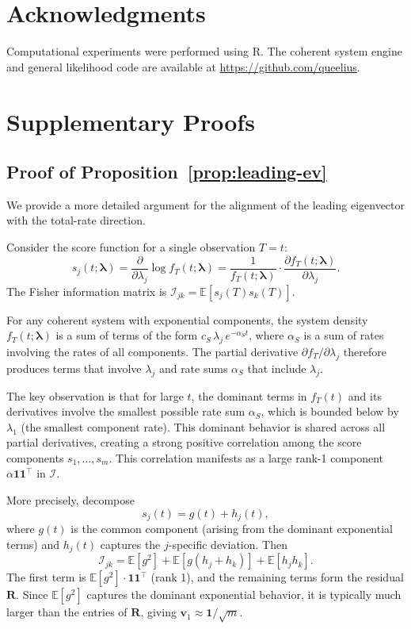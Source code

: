 \documentclass[12pt]{article}
\theoremstyle{definition}
\theoremstyle{remark}
\newcommand{\E}{\mathbb{E}}
\newcommand{\bone}{\mathbf{1}}
\newcommand{\blam}{\boldsymbol{\lambda}}
\begin{document}
\section*{Acknowledgments}

Computational experiments were performed using R.  The coherent system
engine and general likelihood code are available at
\url{https://github.com/queelius}.


\appendix
\section{Supplementary Proofs}
\label{sec:appendix}

\subsection{Proof of Proposition~\ref{prop:leading-ev}}
\label{sec:proof-leading-ev}

We provide a more detailed argument for the alignment of the leading
eigenvector with the total-rate direction.

Consider the score function for a single observation $T = t$:
\[
  s_j(t; \blam) = \frac{\partial}{\partial \lambda_j} \log f_T(t; \blam)
  = \frac{1}{f_T(t; \blam)} \cdot \frac{\partial f_T(t; \blam)}{\partial \lambda_j}.
\]
The Fisher information matrix is $\mathcal{I}_{jk} = \E[s_j(T) s_k(T)]$.

For any coherent system with exponential components, the system density
$f_T(t; \blam)$ is a sum of terms of the form
$c_{S} \, \lambda_j \, e^{-\alpha_S t}$, where $\alpha_S$ is a sum
of rates involving the rates of all components.  The partial derivative
$\partial f_T / \partial \lambda_j$ therefore produces terms that
involve $\lambda_j$ and rate sums $\alpha_S$ that include $\lambda_j$.

The key observation is that for large $t$, the dominant terms in
$f_T(t)$ and its derivatives involve the smallest possible rate sum
$\alpha_S$, which is bounded below by $\lambda_1$ (the smallest
component rate).  This dominant behavior is shared across all partial
derivatives, creating a strong positive correlation among the score
components $s_1, \ldots, s_m$.  This correlation manifests as a large
rank-1 component $\alpha \bone \bone^\top$ in $\mathcal{I}$.

More precisely, decompose
\[
  s_j(t) = g(t) + h_j(t),
\]
where $g(t)$ is the common component (arising from the dominant
exponential terms) and $h_j(t)$ captures the $j$-specific deviation.
Then
\[
  \mathcal{I}_{jk} = \E[g^2] + \E[g(h_j + h_k)] + \E[h_j h_k].
\]
The first term is $\E[g^2] \cdot \bone\bone^\top$ (rank 1), and the
remaining terms form the residual $\mathbf{R}$.  Since $\E[g^2]$
captures the dominant exponential behavior, it is typically much
larger than the entries of $\mathbf{R}$, giving $\mathbf{v}_1 \approx
\bone / \sqrt{m}$.
\end{document}

